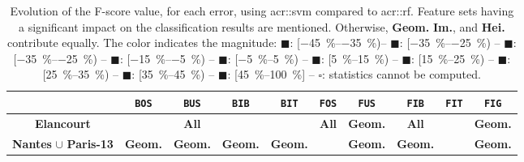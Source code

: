         \begin{table}[htbp]
            \footnotesize 
            \centering
            \renewcommand{\arraystretch}{2.5}
            \begin{tabular}{c | c c c c |c c c c c}
                \hline
                & \texttt{BOS} & \texttt{BUS}&\texttt{BIB}&\texttt{BIT}&\texttt{FOS} & \texttt{FUS}&\texttt{FIB}&\texttt{FIT}&\texttt{FIG}\\
                \hline
                \textbf{Elancourt} & \cellcolor{STBL} & \cellcolor{STBL}\textbf{All}& \cellcolor{GAIN45} & \cellcolor{GAIN45} & \cellcolor{LOSS2535}\textbf{All} & \cellcolor{GAIN3545}\textbf{Geom.} & \cellcolor{GAIN2535}\textbf{All} & \cellcolor{GAIN45} & \cellcolor{STBL}\textbf{Geom.}\\
                \shortstack{\textbf{Nantes} \(\cup\)\\ \textbf{Paris-13}} & \cellcolor{LOSS1525}\textbf{Geom.}& \cellcolor{LOSS0515}\textbf{Geom.}& \cellcolor{GAIN1525}\textbf{Geom.} & \cellcolor{GAIN1525}\textbf{Geom.} & \cellcolor{LOSS0515} & \cellcolor{LOSS1525}\textbf{Geom.} & \cellcolor{LOSS0515}\textbf{Geom.} & \cellcolor{GAIN45} & \cellcolor{LOSS0515}\textbf{Geom.}\\
                \hline
            \end{tabular}
            \renewcommand{\arraystretch}{1}
            \caption{
                \label{tab::rf_vs_svm_comparison} Evolution of the F-score value, for each error, using \gls{acr::svm} compared to \gls{acr::rf}.
                Feature sets having a significant impact on the classification results are mentioned.
                Otherwise, \textbf{Geom.} \textbf{Im.}, and \textbf{Hei.} contribute equally.
                The color indicates the magnitude: \textcolor{LOSS3545}{$\blacksquare$}: [\SIrange[range-phrase={,  }]{-45}{-35}{\percent})--
                \textcolor{LOSS2535}{$\blacksquare$}: [\SIrange[range-phrase={, }]{-35}{-25}{\percent}) --
                \textcolor{LOSS1525}{$\blacksquare$}: [\SIrange[range-phrase={, }]{-35}{-25}{\percent}) --
                \textcolor{LOSS0515}{$\blacksquare$}: [\SIrange[range-phrase={, }]{-15}{-5}{\percent}) --
                \textcolor{STBL}{$\blacksquare$}: [\SIrange[range-phrase={, }]{-5}{5}{\percent}) --
                \textcolor{GAIN0515}{$\blacksquare$}: [\SIrange[range-phrase={, }]{5}{15}{\percent}) --
                \textcolor{GAIN1525}{$\blacksquare$}: [\SIrange[range-phrase={, }]{15}{25}{\percent}) --
                \textcolor{GAIN2535}{$\blacksquare$}: [\SIrange[range-phrase={, }]{25}{35}{\percent}) --
                \textcolor{GAIN3545}{$\blacksquare$}: [\SIrange[range-phrase={, }]{35}{45}{\percent}) --
                \textcolor{GAIN45}{$\blacksquare$}: [\SIrange[range-phrase={, }]{45}{100}{\percent}] --
                $\square$: statistics cannot be computed.
            }
        \end{table}

